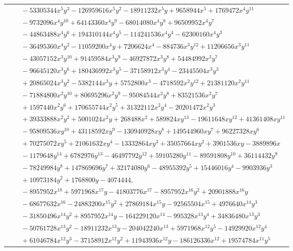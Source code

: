 \documentclass[11pt]{article}
\begin{document}
\begin{longtable}{@{}ll@{}}
 & $\quad -53305344x^{5}y^{3}-126959616x^{5}y^{2}-18911232x^{5}y+9658944x^{5}+1769472x^{4}y^{11}$\\
 & $\quad -9732096x^{4}y^{10}+64143360x^{4}y^{9}-68014080x^{4}y^{8}+96509952x^{4}y^{7}$\\
 & $\quad -44863488x^{4}y^{6}+194310144x^{4}y^{5}-114241536x^{4}y^{4}-62300160x^{4}y^{3}$\\
 & $\quad -36495360x^{4}y^{2}-11059200x^{4}y+7206624x^{4}-884736x^{3}y^{12}+11206656x^{3}y^{11}$\\
 & $\quad -43057152x^{3}y^{10}+91459584x^{3}y^{9}-46927872x^{3}y^{8}+54484992x^{3}y^{7}$\\
 & $\quad -96645120x^{3}y^{6}+180436992x^{3}y^{5}-37158912x^{3}y^{4}-23445504x^{3}y^{3}$\\
 & $\quad +20865024x^{3}y^{2}-5382144x^{3}y+5752800x^{3}-4718592x^{2}y^{12}+21381120x^{2}y^{11}$\\
 & $\quad -71884800x^{2}y^{10}+80695296x^{2}y^{9}-95084544x^{2}y^{8}+83521536x^{2}y^{7}$\\
 & $\quad +1597440x^{2}y^{6}+170655744x^{2}y^{5}+31322112x^{2}y^{4}-20201472x^{2}y^{3}$\\
 & $\quad +39333888x^{2}y^{2}+5001024x^{2}y+268488x^{2}+589824xy^{13}-19611648xy^{12}+41361408xy^{11}$\\
 & $\quad -95809536xy^{10}+43118592xy^{9}-130940928xy^{8}+149544960xy^{7}+96227328xy^{6}$\\
 & $\quad +70275072xy^{5}+21061632xy^{4}-13332864xy^{3}+35057664xy^{2}+3901536xy-3889896x$\\
 & $\quad -1179648y^{14}+6782976y^{13}-46497792y^{12}+59105280y^{11}-89591808y^{10}+36114432y^{9}$\\
 & $\quad -78249984y^{8}+147869696y^{7}+32174080y^{6}-48955392y^{5}+15446016y^{4}-9903936y^{3}$\\
 & $\quad +10973184y^{2}+1768800y-4074444,$\\
 & $\quad -8957952x^{18}+5971968x^{17}y-41803776x^{17}-8957952x^{16}y^{2}+20901888x^{16}y$\\
 & $\quad -68677632x^{16}-24883200x^{15}y^{2}+27869184x^{15}y-92565504x^{15}+4976640x^{14}y^{3}$\\
 & $\quad -31850496x^{14}y^{2}+8957952x^{14}y-164229120x^{14}-995328x^{13}y^{4}+34836480x^{13}y^{3}$\\
 & $\quad -50761728x^{13}y^{2}-18911232x^{13}y-204042240x^{13}+5971968x^{12}y^{5}-14929920x^{12}y^{4}$\\
 & $\quad +61046784x^{12}y^{3}-37158912x^{12}y^{2}+11943936x^{12}y-186126336x^{12}+19574784x^{11}y^{5}$\\

\end{longtable}
\end{document}
